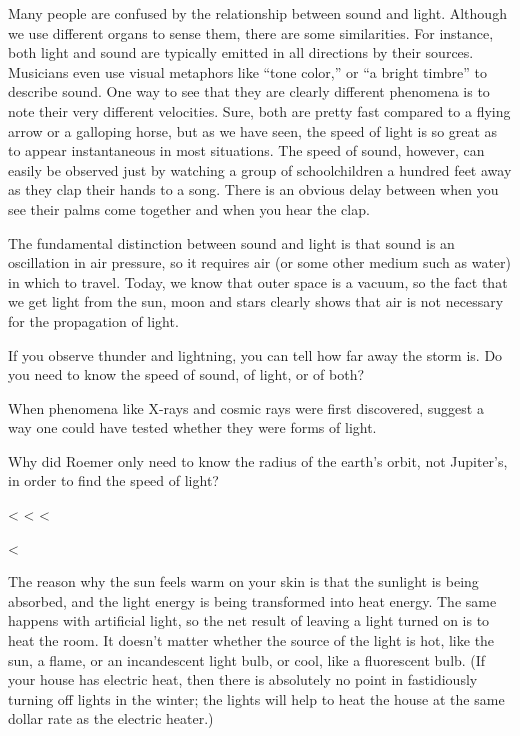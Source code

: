 Many people are confused by the relationship between sound
and light. Although we use different organs to sense them,
there are some similarities. For instance, both light and
sound are typically emitted in all directions by their
sources. Musicians even use visual metaphors like ``tone
color,'' or ``a bright timbre'' to describe sound. One way
to see that they are clearly different phenomena is to note
their very different velocities. Sure, both are pretty fast
compared to a flying arrow or a galloping horse, but as we
have seen, the speed of light is so great as to appear
instantaneous in most situations. The speed of sound,
however, can easily be observed just by watching a group of
schoolchildren a hundred feet away as they clap their hands
to a song. There is an obvious delay between when you see
their palms come together and when you hear the clap.

The fundamental distinction between sound and light is that
sound is an oscillation in air pressure, so it requires air
(or some other medium such as water) in which to travel.
Today, we know that outer space is a vacuum, so the fact
that we get light from the sun, moon and stars clearly shows
that air is not necessary for the propagation of light.

\startdqs

\begin{dq}
If you observe thunder and lightning, you can tell how
far away the storm is. Do you need to know the speed of
sound, of light, or of both?
\end{dq}

\begin{dq}
When phenomena like X-rays and cosmic rays were first
discovered, suggest a way one could have tested whether they
were forms of light.
\end{dq}

\begin{dq}
Why did Roemer only need to know the radius of the
earth's orbit, not Jupiter's, in order to find the speed of light?
\end{dq}

<%
<%
<%

<%

The reason why the sun feels warm on your skin is that the
sunlight is being absorbed, and the light energy is being
transformed into heat energy. The same happens with
artificial light, so the net result of leaving a light
turned on is to heat the room. It doesn't matter whether the
source of the light is hot, like the sun, a flame, or an
incandescent light bulb, or cool, like a fluorescent bulb.
(If your house has electric heat, then there is absolutely
no point in fastidiously turning off lights in the winter;
the lights will help to heat the house at the same dollar
rate as the electric heater.)

